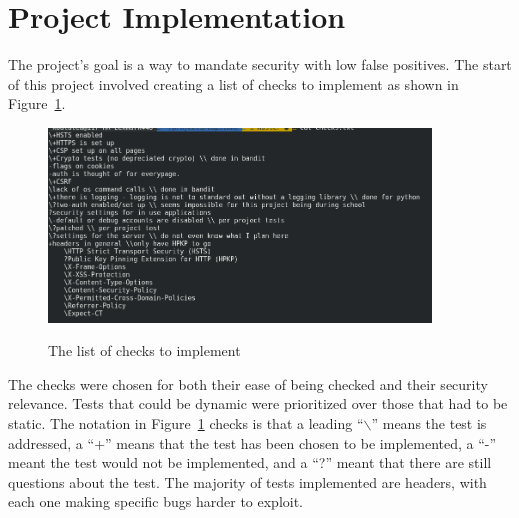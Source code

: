 \section{Project Implementation}
The project's goal is a way to mandate security with low false positives. The start of this project involved creating a list of checks to implement as shown in Figure~\ref{fig:fig1}.
\begin{figure}[!ht]
  \centering
\includegraphics[width=4in]{unittestchecks}
\caption{\label{fig:fig1}}The list of checks to implement
\end{figure}
The checks were chosen for both their ease of being checked and their security relevance. Tests that could be dynamic were prioritized over those that had to be static. The notation in 
Figure~\ref{fig:fig1} checks is that a leading ``$\backslash$'' means the test is addressed, a ``+'' means that the test has been chosen to be implemented, a ``-'' meant the test would not be implemented,
and a ``?'' meant that there are still questions about the test. The majority of tests implemented are headers, with each one making specific bugs harder to exploit.

